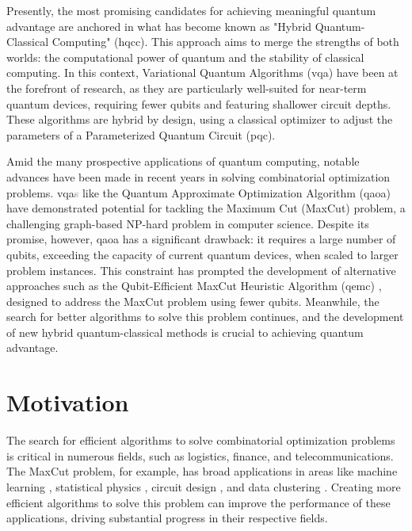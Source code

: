 Presently, the most promising candidates for achieving meaningful quantum advantage are anchored in what has become known as "Hybrid Quantum-Classical Computing" (\acrshort{hqcc}). This approach aims to merge the strengths of both worlds: the computational power of quantum and the stability of classical computing. In this context, Variational Quantum Algorithms (\acrshort{vqa}) have been at the forefront of research, as they are particularly well-suited for near-term quantum devices, requiring fewer qubits and featuring shallower circuit depths. These algorithms are hybrid by design, using a classical optimizer to adjust the parameters of a Parameterized Quantum Circuit (\acrshort{pqc}).

Amid the many prospective applications of quantum computing, notable advances have been made in recent years in solving combinatorial optimization problems. \acrshort{vqa}\textcolor{gray}{s} like the Quantum Approximate Optimization Algorithm (\acrshort{qaoa}) \cite{farhi2014quantum} have demonstrated potential for tackling the Maximum Cut (MaxCut) problem, a challenging graph-based NP-hard problem in computer science. Despite its promise, however, \acrshort{qaoa} has a significant drawback: it requires a large number of qubits, exceeding the capacity of current quantum devices, when scaled to larger problem instances. This constraint has prompted the development of alternative approaches such as the Qubit-Efficient MaxCut Heuristic Algorithm (\acrshort{qemc}) \cite{tenecohen2023variational}, designed to address the MaxCut problem using fewer qubits. Meanwhile, the search for better algorithms to solve this problem continues, and the development of new hybrid quantum-classical methods is crucial to achieving quantum advantage.

\section{Motivation}
\label{section:motivation}



The search for efficient algorithms to solve combinatorial optimization problems is critical in numerous fields, such as logistics, finance, and telecommunications. The MaxCut problem, for example, has broad applications in areas like machine learning \cite{937505}, statistical physics \cite{Barahona_Grötschel_Jünger_Reinelt_1988}, circuit design \cite{Barahona_Grötschel_Jünger_Reinelt_1988}, and data clustering \cite{10.1007/11893318_21}. Creating more efficient algorithms to solve this problem can improve the performance of these applications, driving substantial progress in their respective fields.

